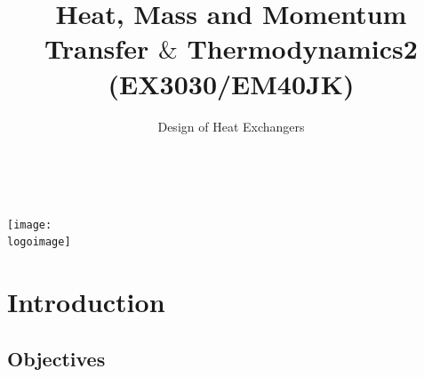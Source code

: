 \documentclass[10pt,compress]{beamer}
\institute{School of Engineering}
\title{Heat, Mass and Momentum Transfer $\&$ Thermodynamics2 (EX3030/EM40JK)}
\subtitle{Design of Heat Exchangers}
\date[ ]{ }
\author[\shortname]{%
  \fullname\\\ttfamily{\emailaddress}
}
\newcommand{\logoimage}{../FigBanner/UoAHorizBanner}
\begin{document}
\begin{frame}
  \titlepage
  \vfill%
  \begin{center}
    \texttt{[image: \\logoimage]}
  \end{center}
\end{frame}




\section{Introduction} 


\subsection{Objectives}
\end{document}
